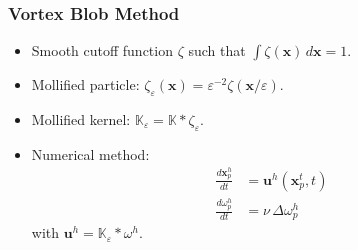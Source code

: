 \documentclass[12pt,english]{beamer}
\newcommand{\K}{\mathbb{K}}  %
\renewcommand{\vec}{\mathbf}
\newcommand{\x}{\vec x}      %
\newcommand{\vel}{\vec u}    %
\newcommand{\od}[2]{\frac{d#1}{d#2}}
\begin{document}
  \begin{frame}
    \frametitle{Vortex Blob Method}
    \begin{itemize}
      \item Smooth cutoff function \(ζ\) such that \(\int ζ(\x)\,d\x = 1\).
      \item Mollified particle: \(ζ_ε(\x) = ε^{-2} ζ(\x/ε)\).
      \item Mollified kernel:   \(\K_ε = \K * ζ_ε\).
      \item Numerical method:
        \begin{align}
          \od{\x^h_p}{t} &= \vel^h(\x^t_p, t) \\
          \od{ω^h_p}{t}    &= ν\,Δω^h_p
        \end{align}
        with \(\vel^h = \K_ε * ω^h\).
    \end{itemize}
  \end{frame}
\end{document}

